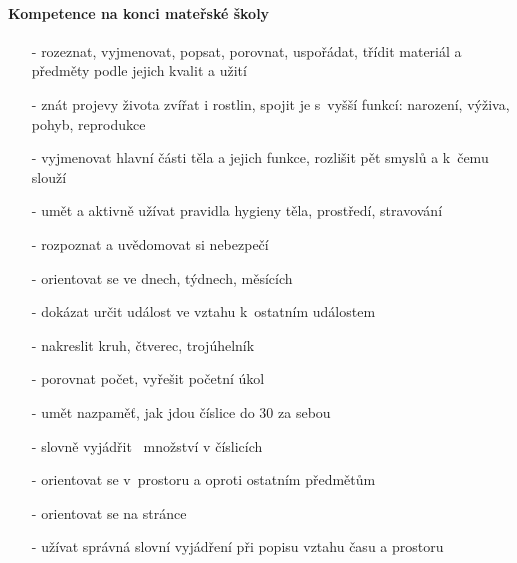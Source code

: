 			\paragraph{Kompetence na konci mateřské školy}
				\begin{itemize}
					\setlength\itemsep{-2mm}
					\item[-] rozeznat, vyjmenovat, popsat, porovnat, uspořádat, třídit materiál a předměty podle jejich kvalit a užití
					\item[-] znát projevy života zvířat i rostlin, spojit je s vyšší funkcí: narození, výživa, pohyb, reprodukce
					\item[-] vyjmenovat hlavní části těla a jejich funkce, rozlišit pět smyslů a k čemu slouží
					\item[-] umět a aktivně užívat pravidla hygieny těla, prostředí, stravování
					\item[-] rozpoznat a uvědomovat si nebezpečí
					\item[-] orientovat se ve dnech, týdnech, měsících
					\item[-] dokázat určit událost ve vztahu k ostatním událostem
					\item[-] nakreslit kruh, čtverec, trojúhelník
					\item[-] porovnat počet, vyřešit početní úkol
					\item[-] umět nazpaměť, jak jdou číslice do 30 za sebou 
					\item[-] slovně vyjádřit  množství v číslicích 
					\item[-] orientovat se v prostoru a oproti ostatním předmětům
					\item[-] orientovat se na stránce
					\item[-] užívat správná slovní vyjádření při popisu vztahu času a prostoru
				\end{itemize}

